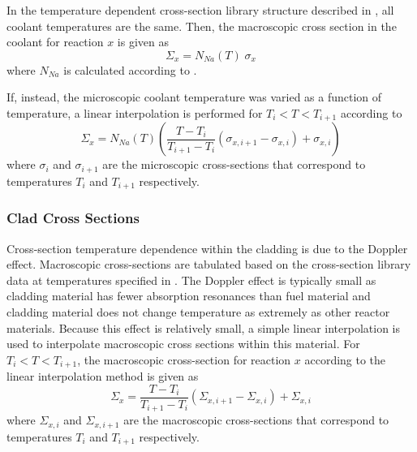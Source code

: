       In the temperature dependent cross-section library structure described in
      , all coolant temperatures are the same. Then, the
      macroscopic cross section in the coolant for reaction $x$ is given as
      \begin{equation}
        \Sigma_x = N_{Na}(T) \; \sigma_x
      \end{equation}
      where $N_{Na}$ is calculated according to .

      If, instead, the microscopic coolant temperature was varied as a function
      of temperature, a linear interpolation is performed for $T_{i}<T<T_{i+1}$
      according to
      \begin{equation}
        \Sigma_{x} = N_{Na}(T) 
          \left( \frac{T - T_{i}}{T_{i+1}-T_{i}} 
          (\sigma_{x,i+1} - \sigma_{x,i})  + \sigma_{x,i}\right)
      \end{equation}
      where $\sigma_i$ and $\sigma_{i+1}$ are the microscopic cross-sections
      that correspond to temperatures $T_i$ and $T_{i+1}$ respectively.

    \subsubsection{Clad Cross Sections}
      Cross-section temperature dependence within the cladding is due to the
      Doppler effect. Macroscopic cross-sections are tabulated based on the
      cross-section library data at temperatures specified in
      . The Doppler effect is typically small as cladding
      material has fewer absorption resonances than fuel material and cladding
      material does not change temperature as extremely as other reactor
      materials. Because this effect is relatively small, a simple linear
      interpolation is used to interpolate macroscopic cross sections within
      this material. For $T_i < T < T_{i+1}$, the macroscopic cross-section for
      reaction $x$ according to the linear interpolation method is given as
      \begin{equation}
        \label{eq:xs_linear_interpolation}
        \Sigma_{x} = 
          \frac{T - T_{i}}{T_{i+1}-T_{i}} 
          (\Sigma_{x,i+1} - \Sigma_{x,i})  + \Sigma_{x,i}
      \end{equation}
      where $\Sigma_{x,i}$ and $\Sigma_{x,i+1}$ are the macroscopic
      cross-sections that correspond to temperatures $T_i$ and $T_{i+1}$
      respectively. 

